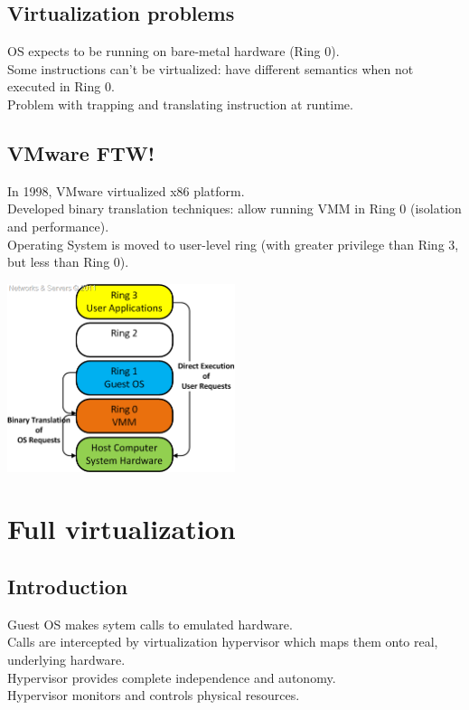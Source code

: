 \documentclass{beamer}
\begin{document}
\subsection{Virtualization problems}
\begin{frame}
OS expects to be running on bare-metal hardware (Ring 0). \\
Some instructions can't be virtualized: have different semantics when not executed in Ring 0. \\
Problem with trapping and translating instruction at runtime.
\end{frame}

\subsection{VMware FTW!}
\begin{frame}
In 1998, VMware virtualized x86 platform. \\
\pause
Developed binary translation techniques: allow running VMM in Ring 0 (isolation and performance). \\
\pause
Operating System is moved to user-level ring (with greater privilege than Ring 3, but less than Ring 0).
\pause
\begin{center}
\includegraphics[width=0.5\textwidth]{images/ring3.png}
\end{center}
\end{frame}

\section{Full virtualization}
\subsection{Introduction}
\begin{frame}
Guest OS makes sytem calls to emulated hardware. \\
\pause
Calls are intercepted by virtualization hypervisor which maps them onto real, underlying hardware. \\
\pause
Hypervisor provides complete independence and autonomy. \\
\pause
Hypervisor monitors and controls physical resources.
\end{frame}
\end{document}
